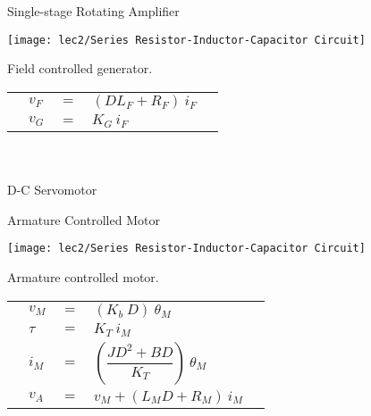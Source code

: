 \vspace{-1em}
\hspace*{\fill}\\[+2mm]
\\[-1.5em]


Single-stage Rotating Amplifier\\[-1mm]
\begin{marginfigure}[-1em]
		\texttt{[image: lec2/Series Resistor-Inductor-Capacitor Circuit]}
		\caption{Field controlled generator.}
\end{marginfigure}

\begin{tabular}{C{1mm} C{1mm} C{2cm} l l}
			&$v_F$& $=$ & $(DL_F+R_F)\ i_F$ &\\
			&$v_G$& $=$ & $K_G\ i_F$&\\
\end{tabular}

\vspace{-1em}
\hspace*{\fill}\\[+2mm]
\\[-1.5em]

D-C Servomotor\\[-1mm]

Armature Controlled Motor\\[-1mm]
\begin{marginfigure}[-1em]
		\texttt{[image: lec2/Series Resistor-Inductor-Capacitor Circuit]}
		\caption{Armature controlled motor.}
\end{marginfigure}

\begin{tabular}{C{1mm} C{1mm} C{2cm} l l}
			&$v_M$ & $=$ & $(K_b\ D)\ \theta_M$ &\\
			&$\tau$& $=$ & $K_T\ i_M$ &\\
			&$i_M$ & $=$ & $(\dfrac{JD^2+BD}{K_T})\ \theta_M$ &\\
			&$v_A$ & $=$ & $v_M + (L_M D+R_M)\ i_M$ &\\
\end{tabular}

\vspace{-1em}
\hspace*{\fill}\\[+2mm]
\\[-1.5em]

